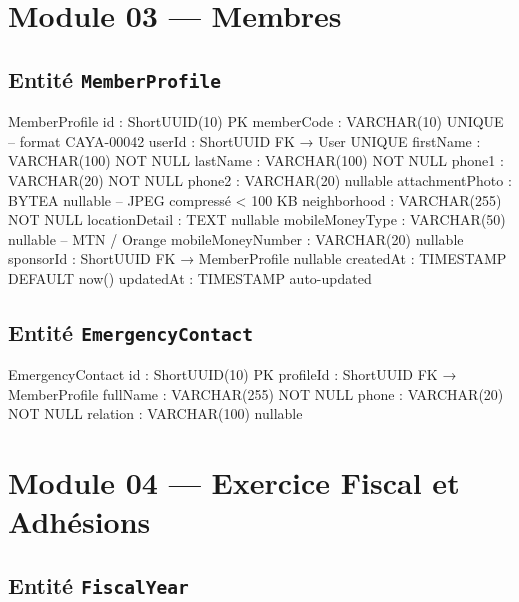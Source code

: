 \documentclass[12pt, a4paper]{report}
\begin{document}
\section{Module 03 — Membres}

\subsection{Entité \texttt{MemberProfile}}

\begin{codeBox}
MemberProfile {
  id                : ShortUUID(10)  PK
  memberCode        : VARCHAR(10)    UNIQUE  -- format CAYA-00042
  userId            : ShortUUID      FK → User  UNIQUE
  firstName         : VARCHAR(100)   NOT NULL
  lastName          : VARCHAR(100)   NOT NULL
  phone1            : VARCHAR(20)    NOT NULL
  phone2            : VARCHAR(20)    nullable
  attachmentPhoto   : BYTEA          nullable  -- JPEG compressé < 100 KB
  neighborhood      : VARCHAR(255)   NOT NULL
  locationDetail    : TEXT           nullable
  mobileMoneyType   : VARCHAR(50)    nullable  -- MTN / Orange
  mobileMoneyNumber : VARCHAR(20)    nullable
  sponsorId         : ShortUUID      FK → MemberProfile  nullable
  createdAt         : TIMESTAMP      DEFAULT now()
  updatedAt         : TIMESTAMP      auto-updated
}
\end{codeBox}

\subsection{Entité \texttt{EmergencyContact}}

\begin{codeBox}
EmergencyContact {
  id          : ShortUUID(10)  PK
  profileId   : ShortUUID      FK → MemberProfile
  fullName    : VARCHAR(255)   NOT NULL
  phone       : VARCHAR(20)    NOT NULL
  relation    : VARCHAR(100)   nullable
}
\end{codeBox}

\section{Module 04 — Exercice Fiscal et Adhésions}

\subsection{Entité \texttt{FiscalYear}}
\end{document}
